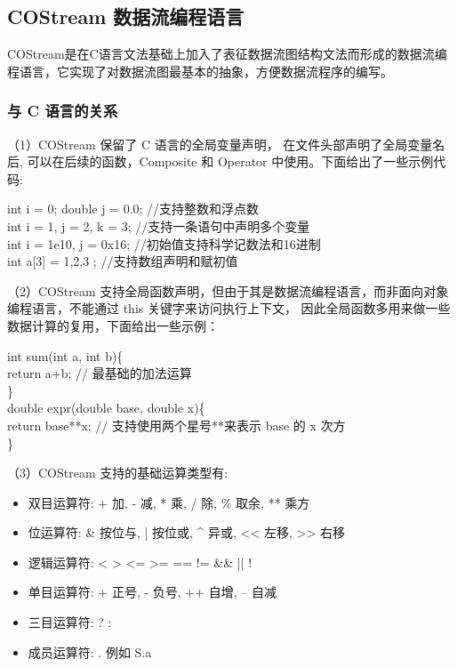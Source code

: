 \subsection{COStream 数据流编程语言}
COStream是在C语言文法基础上加入了表征数据流图结构文法而形成的数据流编程语言，它实现了对数据流图最基本的抽象，方便数据流程序的编写。

\subsubsection{与 C 语言的关系}
（1）COStream 保留了 C 语言的全局变量声明， 在文件头部声明了全局变量名后, 可以在后续的函数，Composite 和 Operator 中使用。下面给出了一些示例代码:
\begin{algorithm}\label{algo:standard}
int i = 0; double j = 0.0; //支持整数和浮点数\\
int i = 1, j = 2, k = 3; //支持一条语句中声明多个变量\\
int i = 1e10, j = 0x16; //初始值支持科学记数法和16进制\\
int a[3] = { 1,2,3 };   //支持数组声明和赋初值
\end{algorithm}

（2）COStream 支持全局函数声明，但由于其是数据流编程语言，而非面向对象编程语言，不能通过 this 关键字来访问执行上下文， 因此全局函数多用来做一些数据计算的复用，下面给出一些示例：

\begin{algorithm}\label{algo:standard}
int sum(int a, int b)\{\\
\hspace*{1 pc} return a+b; // 最基础的加法运算\\
\}\\
double expr(double base, double x)\{\\
\hspace*{1 pc} return base**x; // 支持使用两个星号**来表示 base 的 x 次方\\
\}
\end{algorithm}
（3）COStream 支持的基础运算类型有: 
\begin{itemize}
    \item 双目运算符: + 加, - 减, * 乘, / 除, \% 取余, ** 乘方
    \item 位运算符: \& 按位与, | 按位或, \^{} 异或, << 左移, >> 右移
    \item 逻辑运算符: < > <= >= == != \&\& || !
    \item 单目运算符: + 正号, - 负号, ++ 自增, -- 自减
    \item 三目运算符: ? :
    \item 成员运算符: . 例如 S.a
\end{itemize}

